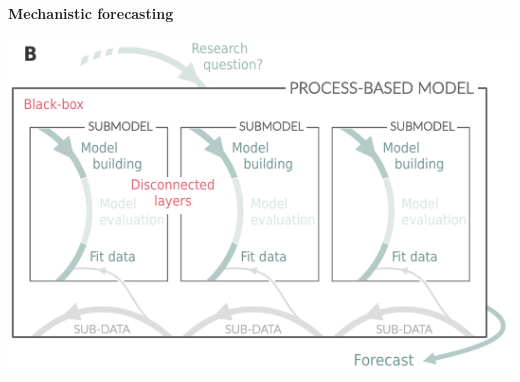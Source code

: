 \documentclass[11pt]{article}
\begin{document}
\begin{tcolorbox}
{\begin{multicols}{2}

\vfill

\columnbreak

\centerline{\bf Mechanistic forecasting}
\vspace*{2mm}
\begin{minipage}[t]{\linewidth}
    \includegraphics[width=\linewidth]{figures/forecasting_details}

    \vspace*{1mm}
\end{minipage}


\end{multicols}}
\end{tcolorbox}
\end{document}
